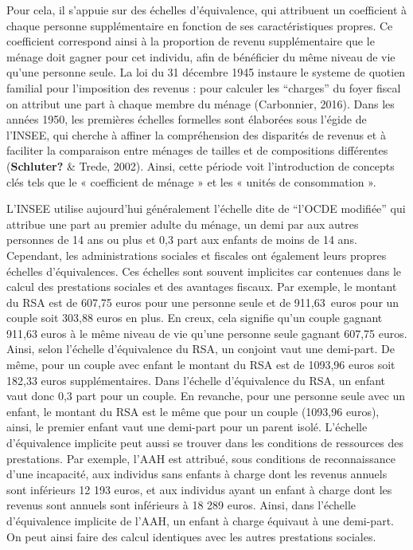 \documentclass[
  12pt,
]{book}
\begin{document}
Pour cela, il s'appuie sur des échelles d'équivalence, qui attribuent un
coefficient à chaque personne supplémentaire en fonction de ses
caractéristiques propres. Ce coefficient correspond ainsi à la
proportion de revenu supplémentaire que le ménage doit gagner pour cet
individu, afin de bénéficier du même niveau de vie qu'une personne
seule. La loi du 31 décembre 1945 instaure le systeme de quotien
familial pour l'imposition des revenus : pour calculer les ``charges''
du foyer fiscal on attribut une part à chaque membre du ménage
(Carbonnier, 2016). Dans les années 1950, les premières échelles
formelles sont élaborées sous l'égide de l'INSEE, qui cherche à affiner
la compréhension des disparités de revenus et à faciliter la comparaison
entre ménages de tailles et de compositions différentes
(\textbf{Schluter?} \& Trede, 2002). Ainsi, cette période voit
l'introduction de concepts clés tels que le « coefficient de ménage » et
les « unités de consommation ».

L'INSEE utilise aujourd'hui généralement l'échelle dite de ``l'OCDE
modifiée'' qui attribue une part au premier adulte du ménage, un demi
par aux autres personnes de 14 ans ou plus et 0,3 part aux enfants de
moins de 14 ans. Cependant, les administrations sociales et fiscales ont
également leurs propres échelles d'équivalences. Ces échelles sont
souvent implicites car contenues dans le calcul des prestations sociales
et des avantages fiscaux. Par exemple, le montant du RSA est de 607,75
euros pour une personne seule et de 911,63~euros pour un couple soit
303,88 euros en plus. En creux, cela signifie qu'un couple gagnant
911,63 euros à le même niveau de vie qu'une personne seule gagnant
607,75 euros. Ainsi, selon l'échelle d'équivalence du RSA, un conjoint
vaut une demi-part. De même, pour un couple avec enfant le montant du
RSA est de 1093,96 euros soit 182,33 euros supplémentaires. Dans
l'échelle d'équivalence du RSA, un enfant vaut donc 0,3 part pour un
couple. En revanche, pour une personne seule avec un enfant, le montant
du RSA est le même que pour un couple (1093,96 euros), ainsi, le premier
enfant vaut une demi-part pour un parent isolé. L'échelle d'équivalence
implicite peut aussi se trouver dans les conditions de ressources des
prestations. Par exemple, l'AAH est attribué, sous conditions de
reconnaissance d'une incapacité, aux individus sans enfants à charge
dont les revenus annuels sont inférieurs 12 193 euros, et aux individus
ayant un enfant à charge dont les revenus sont annuels sont inférieurs à
18 289 euros. Ainsi, dans l'échelle d'équivalence implicite de l'AAH, un
enfant à charge équivaut à une demi-part. On peut ainsi faire des calcul
identiques avec les autres prestations sociales.
\end{document}
